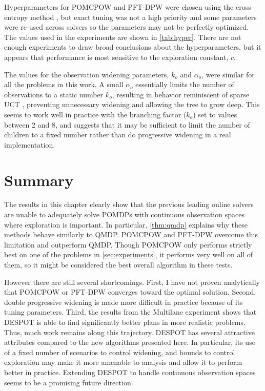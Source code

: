 Hyperparameters for POMCPOW and PFT-DPW were chosen using the cross entropy method \cite{mannor2003cross}, but exact tuning was not a high priority and some parameters were re-used across solvers so the parameters may not be perfectly optimized.
The values used in the experiments are shown in \cref{tab:hyper}. 
There are not enough experiments to draw broad conclusions about the hyperparameters, but it appears that performance is most sensitive to the exploration constant, $c$.

The values for the observation widening parameters, $k_o$ and $\alpha_o$, were similar for all the problems in this work.
A small $\alpha_o$ essentially limits the number of observations to a static number $k_o$, resulting in behavior reminiscent of sparse UCT \cite{browne2012survey}, preventing unnecessary widening and allowing the tree to grow deep.
This seems to work well in practice with the branching factor ($k_o$) set to values between \num{2} and \num{8}, and suggests that it may be sufficient to limit the number of children to a fixed number rather than do progressive widening in a real implementation.

\section{Summary}

The results in this chapter clearly show that the previous leading online solvers are unable to adequately solve POMDPs with continuous observation spaces where exploration is important.
In particular, \cref{thm:qmdp} explains why these methods behave similarly to QMDP.
POMCPOW and PFT-DPW overcome this limitation and outperform QMDP.
Though POMCPOW only performs strictly best on one of the problems in \cref{sec:experiments}, it performs very well on all of them, so it might be considered the best overall algorithm in these tests.

However there are still several shortcomings.
First, I have not proven analytically that POMCPOW or PFT-DPW converges toward the optimal solution.
Second, double progressive widening is made more difficult in practice because of its tuning parameters.
Third, the results from the Multilane experiment shows that DESPOT is able to find significantly better plans in more realistic problems.
Thus, much work remains along this trajectory.
DESPOT has several attractive attributes compared to the new algorithms presented here.
In particular, its use of a fixed number of scenarios to control widening, and bounds to control exploration may make it more amenable to analysis and allow it to perform better in practice.
Extending DESPOT to handle continuous observation spaces seems to be a promising future direction.
